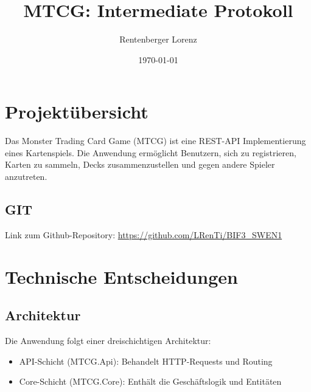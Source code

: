 \documentclass{article}
\title{MTCG: Intermediate Protokoll}
\author{Rentenberger Lorenz}
\date{\today}
\begin{document}
\maketitle

\section{Projektübersicht}
Das Monster Trading Card Game (MTCG) ist eine REST-API Implementierung eines Kartenspiels. Die Anwendung ermöglicht Benutzern, sich zu registrieren, Karten zu sammeln, Decks zusammenzustellen und gegen andere Spieler anzutreten.

\subsection{GIT}
Link zum Github-Repository: \url{https://github.com/LRenTi/BIF3_SWEN1}

\section{Technische Entscheidungen}

\subsection{Architektur}
Die Anwendung folgt einer dreischichtigen Architektur:
\begin{itemize}
    \item API-Schicht (MTCG.Api): Behandelt HTTP-Requests und Routing
    \item Core-Schicht (MTCG.Core): Enthält die Geschäftslogik und Entitäten
\end{itemize}
\end{document}

